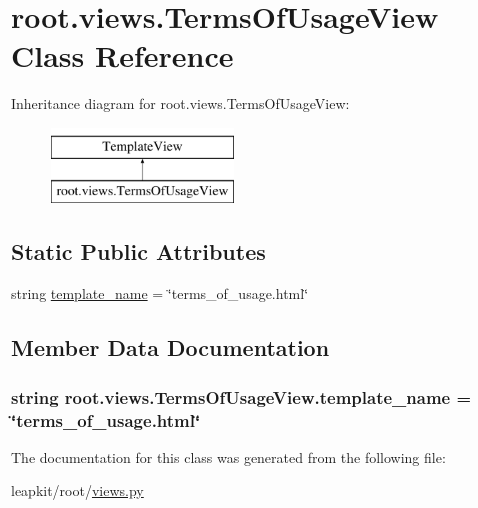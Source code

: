 \hypertarget{classroot_1_1views_1_1_terms_of_usage_view}{\section{root.\-views.\-Terms\-Of\-Usage\-View Class Reference}
\label{classroot_1_1views_1_1_terms_of_usage_view}
}
Inheritance diagram for root.\-views.\-Terms\-Of\-Usage\-View\-:\begin{figure}[H]
\begin{center}
\leavevmode
\includegraphics[height=2.000000cm]{classroot_1_1views_1_1_terms_of_usage_view}
\end{center}
\end{figure}
\subsection*{Static Public Attributes}
\begin{DoxyCompactItemize}
\item 
string \hyperlink{classroot_1_1views_1_1_terms_of_usage_view_af340e2a2e5a6a90673f14b84a2ecf047}{template\-\_\-name} = \char`\"{}terms\-\_\-of\-\_\-usage.\-html\char`\"{}
\end{DoxyCompactItemize}


\subsection{Member Data Documentation}
\hypertarget{classroot_1_1views_1_1_terms_of_usage_view_af340e2a2e5a6a90673f14b84a2ecf047}{
\subsubsection[{template\-\_\-name}]{\setlength{\rightskip}{0pt plus 5cm}string root.\-views.\-Terms\-Of\-Usage\-View.\-template\-\_\-name = \char`\"{}terms\-\_\-of\-\_\-usage.\-html\char`\"{}\hspace{0.3cm}{\ttfamily [static]}}}\label{classroot_1_1views_1_1_terms_of_usage_view_af340e2a2e5a6a90673f14b84a2ecf047}


The documentation for this class was generated from the following file\-:\begin{DoxyCompactItemize}
\item 
leapkit/root/\hyperlink{root_2views_8py}{views.\-py}\end{DoxyCompactItemize}
